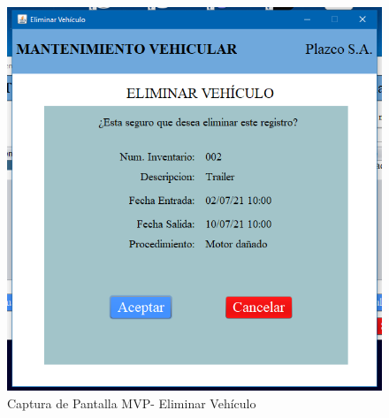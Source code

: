 \begin{figure}
	\centering
	\includegraphics[width=1\textwidth]{./apendice/imagenes/eliminar}
	\caption{Captura de Pantalla MVP- Eliminar Vehículo}
	\label{fig:Captura de Pantalla MVP- Eliminar Vehiculo}
	\end{figure}